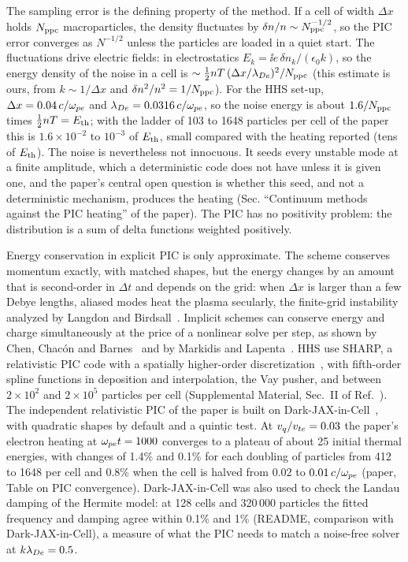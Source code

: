 The sampling error is the defining property of the method. If a cell of width $\Delta x$ holds $N_{\rm ppc}$ macroparticles, the density fluctuates by $\delta n/n\sim N_{\rm ppc}^{-1/2}$, so the PIC error converges as $N^{-1/2}$ unless the particles are loaded in a quiet start. The fluctuations drive electric fields: in electrostatics $E_k=\ii e\,\delta n_k/(\epsilon_0k)$, so the energy density of the noise in a cell is $\sim\tfrac12nT\,(\Delta x/\lambda_{De})^2/N_{\rm ppc}$ (this estimate is ours, from $k\sim1/\Delta x$ and $\delta n^2/n^2=1/N_{\rm ppc}$). For the HHS set-up, $\Delta x=0.04\,c/\omega_{pe}$ and $\lambda_{De}=0.0316\,c/\omega_{pe}$, so the noise energy is about $1.6/N_{\rm ppc}$ times $\tfrac12nT=E_{\rm th}$; with the ladder of 103 to 1648 particles per cell of the paper this is $1.6\times10^{-2}$ to $10^{-3}$ of $E_{\rm th}$, small compared with the heating reported (tens of $E_{\rm th}$). The noise is nevertheless not innocuous. It seeds every unstable mode at a finite amplitude, which a deterministic code does not have unless it is given one, and the paper's central open question is whether this seed, and not a deterministic mechanism, produces the heating (Sec. ``Continuum methods against the PIC heating'' of the paper). The PIC has no positivity problem: the distribution is a sum of delta functions weighted positively.

Energy conservation in explicit PIC is only approximate. The scheme conserves momentum exactly, with matched shapes, but the energy changes by an amount that is second-order in $\Delta t$ and depends on the grid: when $\Delta x$ is larger than a few Debye lengths, aliased modes heat the plasma secularly, the finite-grid instability analyzed by Langdon and Birdsall~\citep{LangdonBirdsall1970}. Implicit schemes can conserve energy and charge simultaneously at the price of a nonlinear solve per step, as shown by Chen, Chac\'on and Barnes~\citep{ChenChacon2011} and by Markidis and Lapenta~\citep{MarkidisLapenta2011}. HHS use SHARP, a relativistic PIC code with a spatially higher-order discretization~\citep{Shalaby2017}, with fifth-order spline functions in deposition and interpolation, the Vay pusher, and between $2\times10^2$ and $2\times10^5$ particles per cell (Supplemental Material, Sec.~II of Ref.~\citep{HHS2026}). The independent relativistic PIC of the paper is built on Dark-JAX-in-Cell~\citep{DarkJIC}, with quadratic shapes by default and a quintic test. At $v_q/v_{te}=0.03$ the paper's electron heating at $\omega_{pe} t=1000$ converges to a plateau of about 25 initial thermal energies, with changes of 1.4\% and 0.1\% for each doubling of particles from 412 to 1648 per cell and 0.8\% when the cell is halved from $0.02$ to $0.01\,c/\omega_{pe}$ (paper, Table on PIC convergence). Dark-JAX-in-Cell was also used to check the Landau damping of the Hermite model: at 128 cells and 320\,000 particles the fitted frequency and damping agree within 0.1\% and 1\% (README, comparison with Dark-JAX-in-Cell), a measure of what the PIC needs to match a noise-free solver at $k\lambda_{De}=0.5$.

